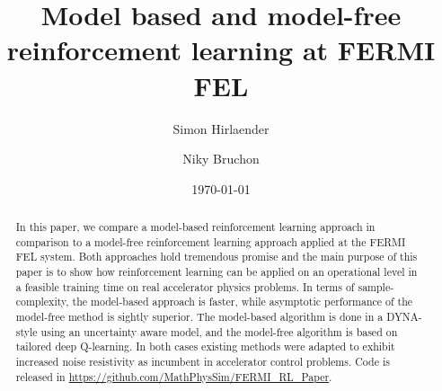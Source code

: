 \documentclass[
reprint,
amsmath,amssymb,amsfonts,clevref,
aps,
prstab,
]{revtex4-2}
\begin{document}
	
	
	
	
	\title{Model based and model-free reinforcement learning at FERMI FEL}
	
	
	
	\author{Simon Hirlaender}
	\author{Niky Bruchon}%
	
	\date{\today}%
	
	
	\begin{abstract}
		In this paper, we compare a model-based reinforcement learning approach in comparison to a model-free reinforcement learning approach applied at the FERMI FEL system. Both approaches hold tremendous promise and the main purpose of this paper is to show how reinforcement learning can be applied on an operational level in a feasible training time on real accelerator physics problems. In terms of sample-complexity, the model-based approach is faster, while asymptotic performance of the model-free method is sightly superior. The model-based algorithm is done in a DYNA-style using an uncertainty aware model, and the model-free algorithm is based on tailored deep Q-learning. In both cases existing methods were adapted to exhibit increased noise resistivity as incumbent in accelerator control problems. Code is released in \url{https://github.com/MathPhysSim/FERMI_RL_Paper}.
		
	\end{abstract}
	\maketitle

\end{document}
